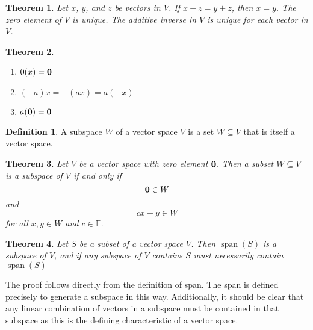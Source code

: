 \documentclass[oneside, 12pt]{book}
\DeclareMathOperator{\spn}{span}
\newtheorem{thm}{Theorem}[section]
\theoremstyle{definition}
\newtheorem{defn}{Definition}[section]
\begin{document}
\begin{thm}
\label{thm_canc}
  Let $x$, $y$, and $z$ be vectors in $V$. If $x+z=y+z$, then $x=y$.
  The zero element of $V$ is unique.
  The additive inverse in $V$ is unique for each vector in $V$.
\end{thm}
\begin{thm}
\label{thm_alg}

\begin{enumerate}
  \item $0(x)=\bold{0}$
  \item $(-a)x=-(ax)=a(-x)$
  \item $a(\bold{0})=\bold{0}$
\end{enumerate}

\end{thm}
\begin{defn}
\label{defn_subspace}
  A subspace $W$ of a vector space $V$ is a set $W \subseteq V$ that is itself a vector space.
\end{defn}
\begin{thm}
\label{thm_subspace}
  Let $V$ be a vector space with zero element $\bold{0}$. Then a subset $W \subseteq V$
  is a subspace of $V$ if and only if \[\bold{0} \in W\] and \[cx+y \in W\] for all $x,y \in W$ and $c \in \mathbb{F}$.

\end{thm}
\begin{thm}
\label{thm_spn}
Let $S$ be a subset of a vector space $V$. Then $\spn(S)$ is a subspace of $V$, and if any subspace of $V$ contains $S$ must necessarily contain $\spn(S)$
\end{thm}
The proof follows directly from the definition of span. The span is defined precisely to generate a subspace in this way. Additionally, it should be clear that any linear combination of vectors in a subspace must be contained in that subspace as this is the defining characteristic of a vector space.
\end{document}
